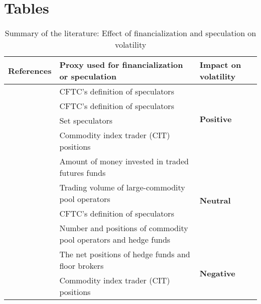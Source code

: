 
\section{Tables}


\begin{landscape}



\begin{table}[]
\caption{Summary of the literature: Effect of financialization and speculation on volatility}
\label{tab:fin}
\begin{tabular}{@{}lll@{}}
\toprule
\textbf{References}                   & \textbf{Proxy used for financialization or speculation}          & \textbf{Impact on volatility}      \\ \midrule
\citet{chang1997interday}  & CFTC’s definition of speculators                                 & \multirow{4}{*}{\textbf{Positive}} \\
\citet{daigler1999impact}              & CFTC’s definition of speculators                                 &                                    \\
\citet{irwin2004effect}                 & Set speculators                                                  &                                    \\
\citet{tang2012index}                  & Commodity index trader (CIT) positions                           &                                    \\ \midrule
\citet{irwin1987note}             & Amount of money invested in traded futures funds                 & \multirow{4}{*}{\textbf{Neutral}}  \\
\citet{irwin1999managed}            & Trading volume of large-commodity pool operators                 &                                    \\
\citet{bryant2006causality}     & CFTC’s definition of speculators                                 &                                    \\
\citet{haigh2007hedge} & Number and positions of commodity pool operators and hedge funds &                                    \\ \midrule
\citet{brunetti2016speculators} & The net positions of hedge funds and floor brokers & \multirow{2}{*}{\textbf{Negative}} \\
\citet{aulerich2012bubbles}     & Commodity index trader (CIT) positions                           &                                    \\ \bottomrule
\end{tabular}
\end{table}
\end{landscape}

